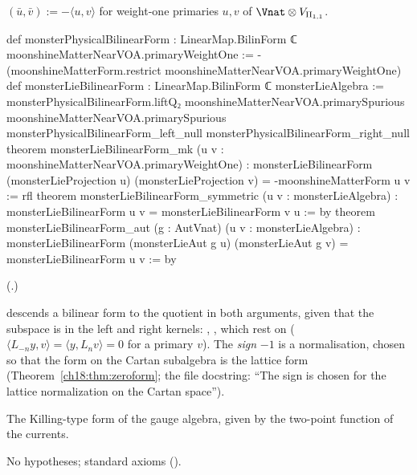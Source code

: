 \begin{definition}\label{ch18:def:monsterform}
$(\bar u,\bar v):=-\langle u,v\rangle$ for weight-one primaries $u,v$ of $\Vnat\otimes V_{\chXVIIIII}$.
\end{definition}
\begin{leancode}
def monsterPhysicalBilinearForm : LinearMap.BilinForm ℂ moonshineMatterNearVOA.primaryWeightOne :=
  -(moonshineMatterForm.restrict moonshineMatterNearVOA.primaryWeightOne)
def monsterLieBilinearForm : LinearMap.BilinForm ℂ monsterLieAlgebra :=
  monsterPhysicalBilinearForm.liftQ₂ moonshineMatterNearVOA.primarySpurious
    moonshineMatterNearVOA.primarySpurious
    monsterPhysicalBilinearForm_left_null monsterPhysicalBilinearForm_right_null
theorem monsterLieBilinearForm_mk (u v : moonshineMatterNearVOA.primaryWeightOne) :
    monsterLieBilinearForm (monsterLieProjection u) (monsterLieProjection v) =
      -moonshineMatterForm u v := rfl
theorem monsterLieBilinearForm_symmetric (u v : monsterLieAlgebra) :
    monsterLieBilinearForm u v = monsterLieBilinearForm v u := by
theorem monsterLieBilinearForm_aut (g : AutVnat) (u v : monsterLieAlgebra) :
    monsterLieBilinearForm (monsterLieAut g u) (monsterLieAut g v) =
      monsterLieBilinearForm u v := by
\end{leancode}
(.)
\begin{dictionary}
 descends a bilinear form to the quotient in both arguments, given that the subspace is in the left
and right kernels: , , which rest on
 ($\langle L_{-n}y,v\rangle=\langle y,L_nv\rangle=0$ for a primary $v$).  The
\emph{sign} $-1$ is a normalisation, chosen so that the form on the Cartan subalgebra is the lattice form
(Theorem~\ref{ch18:thm:zeroform}; the file docstring: ``The sign is chosen for the lattice normalization on the Cartan
space'').
\end{dictionary}
\begin{physics}The Killing-type form of the gauge algebra, given by the two-point function of the currents.\end{physics}
\begin{status}No hypotheses; standard axioms ().\end{status}


